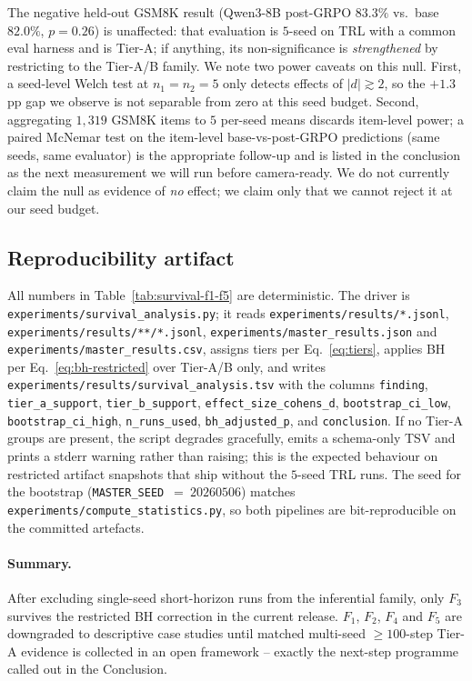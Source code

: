 The negative held-out GSM8K result (Qwen3-8B post-GRPO $83.3\%$ vs.\
base $82.0\%$, $p{=}0.26$) is unaffected: that evaluation is
$5$-seed on TRL with a common eval harness and is Tier-A; if
anything, its non-significance is \emph{strengthened} by restricting
to the Tier-A/B family. We note two power caveats on this null. First,
a seed-level Welch test at $n_1{=}n_2{=}5$ only detects effects of
$|d|\gtrsim 2$, so the $+1.3$\,pp gap we observe is not separable from
zero at this seed budget. Second, aggregating $1{,}319$ GSM8K items to
$5$ per-seed means discards item-level power; a paired McNemar test on
the item-level base-vs-post-GRPO predictions (same seeds, same
evaluator) is the appropriate follow-up and is listed in the conclusion
as the next measurement we will run before camera-ready. We do not
currently claim the null as evidence of \emph{no} effect; we claim
only that we cannot reject it at our seed budget.

\subsection{Reproducibility artifact}
\label{sec:stat-rigor-addendum:repro}

All numbers in Table~\ref{tab:survival-f1-f5} are deterministic.
The driver is
\texttt{experiments/survival\_analysis.py}; it reads
\texttt{experiments/results/*.jsonl},
\texttt{experiments/results/**/*.jsonl},
\texttt{experiments/master\_results.json} and
\texttt{experiments/master\_results.csv}, assigns tiers per
Eq.~\eqref{eq:tiers}, applies BH per Eq.~\eqref{eq:bh-restricted}
over Tier-A/B only, and writes
\texttt{experiments/results/survival\_analysis.tsv} with the
columns \texttt{finding}, \texttt{tier\_a\_support},
\texttt{tier\_b\_support}, \texttt{effect\_size\_cohens\_d},
\texttt{bootstrap\_ci\_low}, \texttt{bootstrap\_ci\_high},
\texttt{n\_runs\_used}, \texttt{bh\_adjusted\_p}, and
\texttt{conclusion}. If no Tier-A groups are present, the script
degrades gracefully, emits a schema-only TSV and prints a stderr
warning rather than raising; this is the expected behaviour on
restricted artifact snapshots that ship without the $5$-seed
TRL runs. The seed for the bootstrap
(\texttt{MASTER\_SEED}~$=~20260506$) matches
\texttt{experiments/compute\_statistics.py}, so both pipelines are
bit-reproducible on the committed artefacts.

\paragraph{Summary.}
After excluding single-seed short-horizon runs from the inferential
family, only $F_3$ survives the restricted BH correction in the
current release. $F_1$, $F_2$, $F_4$ and $F_5$ are downgraded to
descriptive case studies until matched multi-seed $\ge 100$-step
Tier-A evidence is collected in an open framework -- exactly the
next-step programme called out in the Conclusion.
